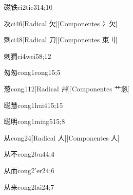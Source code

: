 \begin{verbete}{磁铁}{ci2tie3}{14;10}
\end{verbete}

\begin{verbete}{次}{ci4}{6}[Radical ⽋][Componentes 冫⽋]
\end{verbete}

\begin{verbete}{刺}{ci4}{8}[Radical 刀][Componentes 朿⺉]
\end{verbete}

\begin{verbete}{刺猬}{ci4wei5}{8;12}
\end{verbete}

\begin{verbete}{匆匆}{cong1cong1}{5;5}
\end{verbete}

\begin{verbete}{葱}{cong1}{12}[Radical 艸][Componentes ⺾怱]
\end{verbete}

\begin{verbete}{聪慧}{cong1hui4}{15;15}
\end{verbete}

\begin{verbete}{聪明}{cong1ming5}{15;8}
\end{verbete}

\begin{verbete}{从}{cong2}{4}[Radical ⼈][Componentes ⼈]
\end{verbete}

\begin{verbete}{从不}{cong2bu4}{4;4}
\end{verbete}

\begin{verbete}{从而}{cong2'er2}{4;6}
\end{verbete}

\begin{verbete}{从来}{cong2lai2}{4;7}
\end{verbete}

